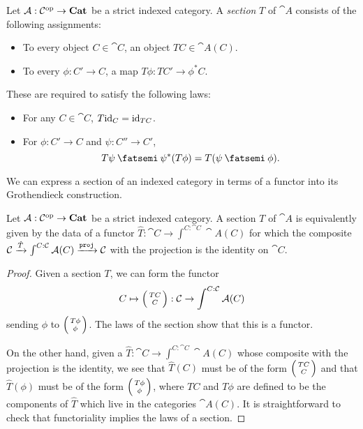 \documentclass[DynamicalBook]{subfiles}
\begin{document}
\begin{definition}
  Let $\mathcal{A} : \mathcal{C}^{\textnormal{op}} \to \textbf{Cat}$ be a strict indexed category. A
  \emph{section} $T$ of $\cat{A}$ consists of the following assignments:
  \begin{itemize}
    \item To every object $C \in \cat{C}$, an object $TC \in \cat{A}(C)$.
    \item To every $\phi : C' \to C$, a map $T\phi : TC' \to \phi^{\ast}C$.
  \end{itemize}
  These are required to satisfy the following laws:
  \begin{itemize}
    \item For any $C \in \cat{C}$, $T\mathrm{id}_C = \mathrm{id}_{TC}$.
    \item For $\phi : C' \to C$ and $\psi : C'' \to C'$,
      $$T\psi \then \psi^{\ast}(T\phi) = T(\psi \then \phi).$$
  \end{itemize}
\end{definition}

We can express a section of an indexed category in terms of a functor into its
Grothendieck construction.
\begin{proposition}\label{prop.section_indexed_category}
  Let $\mathcal{A} : \mathcal{C}^{\textnormal{op}} \to \textbf{Cat}$ be a strict indexed category. A section $T$
  of $\cat{A}$ is equivalently given by the data of a functor $\hat{T} : \cat{C}
  \to \int^{C : \cat{C}} \cat{A}(C)$ for which the composite $\mathcal{C} \xrightarrow{\hat{T}}
  \int^{C : \mathcal{C}}\mathcal{A}(C) \xrightarrow{\mathtt{proj}} \mathcal{C}$ with the projection
  is the identity on $\cat{C}$.
\end{proposition}
\begin{proof}
  Given a section $T$, we can form the functor
  $$C \mapsto \lens{TC}{C} : \cat{C} \to \int^{C : \cat{C}}\cat{A}(C)$$
sending $\phi$ to $\lens{T\phi}{\phi}$. The laws of the section show that this
is a functor. 

On the other hand, given a $\hat{T} : \cat{C} \to \int^{C : \cat{C}}\cat{A}(C)$
whose composite with the projection is the identity, we see that $\hat{T}(C)$
must be of the form $\lens{TC}{C}$ and that $\hat{T}(\phi)$ must be of the form
$\lens{T\phi}{\phi}$, where $TC$ and $T\phi$ are defined to be the components of
$\hat{T}$ which live in the categories $\cat{A}(C)$. It is straightforward to
check that functoriality implies the laws of a section.
\end{proof}
\end{document}
